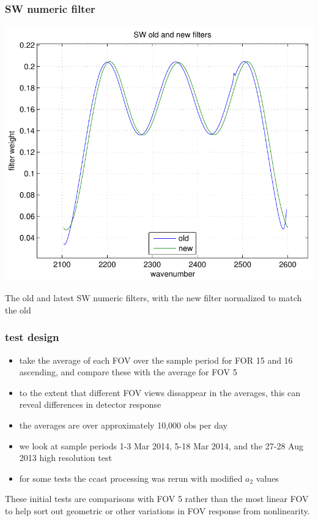 \documentclass[11pt]{beamer}
\begin{document}
\begin{frame}
\frametitle{SW numeric filter}

\begin{center}
  \includegraphics[scale=0.5]{FIR_filter_SW.pdf}
\end{center}

The old and latest SW numeric filters, with the new filter
normalized to match the old

\end{frame}
\begin{frame}
\frametitle{test design}

\begin{itemize}
  \item take the average of each FOV over the sample period for FOR
    15 and 16 ascending, and compare these with the average for FOV
    5

  \item to the extent that different FOV views dissappear in the
    averages, this can reveal differences in detector response

  \item the averages are over approximately 10,000 obs per day

  \item we look at sample periods 1-3 Mar 2014, 5-18 Mar 2014,
    and the 27-28 Aug 2013 high resolution test
    
  \item for some tests the ccast processing was rerun with modified
    $a_2$ values
\end{itemize}

These initial tests are comparisons with FOV 5 rather than the most
linear FOV to help sort out geometric or other variations in FOV
response from nonlinearity.

\end{frame}
\end{document}
